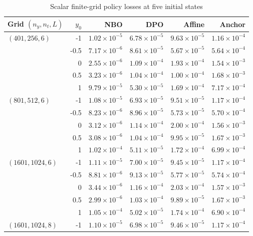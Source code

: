 \begin{table}[!htbp]
\centering\small\setlength{\tabcolsep}{3pt}
\caption{Scalar finite-grid policy losses at five initial states}
\label{tab:r14-reference-five-states}
\begin{tabular}{lrrrrr}
\toprule
Grid $(n_y,n_t,L)$ & $y_0$ & NBO & DPO & Affine & Anchor \\
\midrule
$(401,256,6)$ & -1 & $1.02\times10^{-5}$ & $6.78\times10^{-5}$ & $9.63\times10^{-5}$ & $1.16\times10^{-4}$ \\
 & -0.5 & $7.17\times10^{-6}$ & $8.61\times10^{-5}$ & $5.67\times10^{-5}$ & $5.64\times10^{-4}$ \\
 & 0 & $2.55\times10^{-6}$ & $1.09\times10^{-4}$ & $1.93\times10^{-4}$ & $1.54\times10^{-3}$ \\
 & 0.5 & $3.23\times10^{-6}$ & $1.04\times10^{-4}$ & $1.00\times10^{-4}$ & $1.68\times10^{-3}$ \\
 & 1 & $9.79\times10^{-5}$ & $5.30\times10^{-5}$ & $1.69\times10^{-4}$ & $7.17\times10^{-4}$ \\
\midrule
$(801,512,6)$ & -1 & $1.08\times10^{-5}$ & $6.93\times10^{-5}$ & $9.51\times10^{-5}$ & $1.17\times10^{-4}$ \\
 & -0.5 & $8.23\times10^{-6}$ & $8.96\times10^{-5}$ & $5.73\times10^{-5}$ & $5.70\times10^{-4}$ \\
 & 0 & $3.12\times10^{-6}$ & $1.14\times10^{-4}$ & $2.00\times10^{-4}$ & $1.56\times10^{-3}$ \\
 & 0.5 & $3.08\times10^{-6}$ & $1.04\times10^{-4}$ & $9.95\times10^{-5}$ & $1.67\times10^{-3}$ \\
 & 1 & $1.02\times10^{-4}$ & $5.11\times10^{-5}$ & $1.72\times10^{-4}$ & $6.99\times10^{-4}$ \\
\midrule
$(1601,1024,6)$ & -1 & $1.11\times10^{-5}$ & $7.00\times10^{-5}$ & $9.45\times10^{-5}$ & $1.17\times10^{-4}$ \\
 & -0.5 & $8.81\times10^{-6}$ & $9.13\times10^{-5}$ & $5.77\times10^{-5}$ & $5.74\times10^{-4}$ \\
 & 0 & $3.44\times10^{-6}$ & $1.16\times10^{-4}$ & $2.03\times10^{-4}$ & $1.57\times10^{-3}$ \\
 & 0.5 & $2.99\times10^{-6}$ & $1.03\times10^{-4}$ & $9.89\times10^{-5}$ & $1.67\times10^{-3}$ \\
 & 1 & $1.05\times10^{-4}$ & $5.02\times10^{-5}$ & $1.74\times10^{-4}$ & $6.90\times10^{-4}$ \\
\midrule
$(1601,1024,8)$ & -1 & $1.10\times10^{-5}$ & $6.98\times10^{-5}$ & $9.46\times10^{-5}$ & $1.17\times10^{-4}$ \\

\end{tabular}
\end{table}
